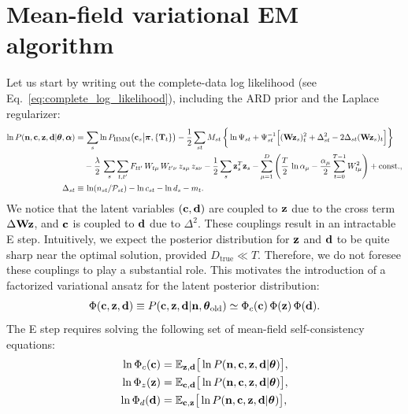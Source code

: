 \documentclass[nofootinbib,amssymb,amsmath]{revtex4}
\newcommand{\vd}{{\bf d}}
\newcommand{\vc}{{\bf c}}
\newcommand{\vz}{{\bf z}}
\newcommand{\vn}{{\bf n}}
\newcommand{\vW}{{\bf W}}
\newcommand{\vtheta}{{\boldsymbol \theta}}
\newcommand{\vpi}{{\boldsymbol \pi}}
\newcommand{\valpha}{{\boldsymbol \alpha}}
\newcommand{\PP}{\mathcal{P}}
\newcommand{\EE}{\mathbb{E}}
\begin{document}
\section{Mean-field variational EM algorithm}
Let us start by writing out the complete-data log likelihood (see Eq.~\ref{eq:complete_log_likelihood}), including the ARD prior and the Laplace regularizer:
\begin{subequations}
\begin{align}
\label{eq:complete_log_likelihood}
\ln P(\vn, \vc, \vz, \vd | \vtheta, \valpha) =&\, \sum_{s} \ln P_\mathrm{HMM}\big(\vc_s \big|\vpi, \{\mathbf{T}_t\}\big) - \frac{1}{2}\sum_{st} M_{st} \, \bigg\{\ln \Psi_{st} + \Psi_{st}^{-1}\Big[(\vW \vz_s)_t^2 + \Delta_{st}^2 - 2\Delta_{st} (\vW \vz_s)_t\Big]\bigg\}\nonumber\\
& - \frac{\lambda}{2} \, \sum_s \sum_{t,t'} F_{tt'} \, W_{t\mu} \, W_{t'\nu} \, z_{s\mu} \, z_{s\nu} - \frac{1}{2}\sum_{s} \vz_s^T \vz_s - \sum_{\mu=1}^{D}\left(\frac{T}{2} \, \ln \alpha_\mu -\frac{\alpha_\mu}{2} \sum_{t=0}^{T-1} W_{t\mu}^2  \right) + \mathrm{const.},\\
\label{eq:delta_def}
\Delta_{st} \equiv&\, \ln(n_{st}/\PP_{st}) - \ln c_{st} - \ln d_s - m_t.
\end{align}
\end{subequations}
We notice that the latent variables $(\vc, \vd)$ are coupled to $\vz$ due to the cross term $\Delta \vW \vz$, and $\vc$ is coupled to $\vd$ due to $\Delta^2$. These couplings result in an intractable E step. Intuitively, we expect the posterior distribution for $\vz$ and $\vd$ to be quite sharp near the optimal solution, provided $D_\mathrm{true} \ll T$. Therefore, we do not foresee these couplings to play a substantial role. This motivates the introduction of a factorized variational ansatz for the latent posterior distribution:
\begin{equation}
\Phi(\vc, \vz, \vd) \equiv P(\vc, \vz, \vd | \vn, \vtheta_\mathrm{old}) \simeq \Phi_c(\vc) \, \Phi(\vz) \, \Phi(\vd).
\end{equation}
The E step requires solving the following set of mean-field self-consistency equations:
\begin{subequations}
\begin{align}
\ln \Phi_c(\vc) &= \EE_{\vz, \vd}\big[\ln P(\vn, \vc, \vz, \vd | \vtheta)\big],\\
\ln \Phi_z(\vz) &= \EE_{\vc, \vd}\big[\ln P(\vn, \vc, \vz, \vd | \vtheta)\big],\\
\ln \Phi_d(\vd) &= \EE_{\vc, \vz}\big[\ln P(\vn, \vc, \vz, \vd | \vtheta)\big],
\end{align}
\end{subequations}
\end{document}
